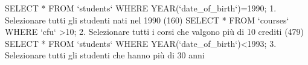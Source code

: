 SELECT * FROM `students` WHERE YEAR(`date_of_birth`)=1990; 1. Selezionare tutti gli studenti nati nel 1990 (160)
SELECT * FROM `courses` WHERE `cfu` >10;  2. Selezionare tutti i corsi che valgono più di 10 crediti (479)
SELECT * FROM `students` WHERE YEAR(`date_of_birth`)<1993; 3. Selezionare tutti gli studenti che hanno più di 30 anni 